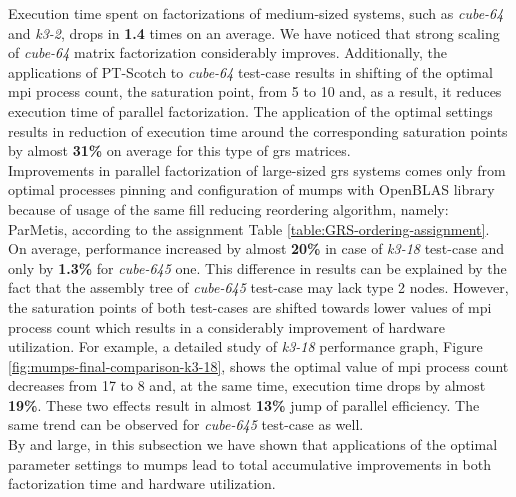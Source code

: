 Execution time spent on factorizations of medium-sized systems, such as \textit{cube-64} and \textit{k3-2}, drops in \textbf{1.4} times on an average. We have noticed that strong scaling of \textit{cube-64} matrix factorization considerably improves. Additionally, the applications of PT-Scotch to \textit{cube-64} test-case results in shifting of the optimal \acrshort{mpi} process count, the saturation point, from 5 to 10 and, as a result, it reduces execution time of parallel factorization. The application of the optimal settings results in reduction of execution time around the corresponding saturation points by almost \textbf{31\%} on average for this type of \acrshort{grs} matrices.\\



Improvements in parallel factorization of large-sized \acrshort{grs} systems comes only from optimal processes pinning and configuration of \acrshort{mumps} with OpenBLAS library because of usage of the same fill reducing reordering algorithm, namely: ParMetis, according to the assignment Table \ref{table:GRS-ordering-assignment}. On average, performance increased by almost \textbf{20\%} in case of \textit{k3-18} test-case and only by \textbf{1.3\%} for \textit{cube-645} one. This difference in results can be explained by the fact that the assembly tree of \textit{cube-645} test-case may lack type 2 nodes. However, the saturation points of both test-cases are shifted towards lower values of  \acrshort{mpi} process count which results in a considerably improvement of hardware utilization. For example, a detailed study of \textit{k3-18} performance graph, Figure \ref{fig:mumps-final-comparison-k3-18}, shows the optimal value of \acrshort{mpi} process count  decreases from 17 to 8 and, at the same time, execution time drops by almost \textbf{19\%}. These two effects result in almost \textbf{13\%} jump of parallel efficiency. The same trend can be observed for \textit{cube-645} test-case as well.\\


By and large, in this subsection we have shown that applications of the optimal parameter settings to \acrshort{mumps} lead to total accumulative improvements in both factorization time and hardware utilization.\\



